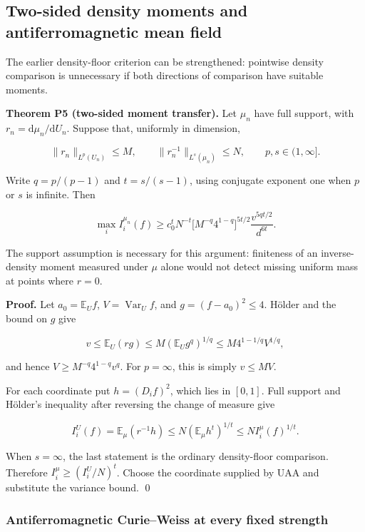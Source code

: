 \subsection{Two-sided density moments and antiferromagnetic mean
field}\label{proof:positive_structure:two-sided-density-moments-and-antiferromagnetic-mean-field}

The earlier density-floor criterion can be strengthened: pointwise
density comparison is unnecessary if both directions of comparison have
suitable moments.

\textbf{Theorem P5 (two-sided moment transfer).} Let \(\mu _n\) have
full support, with \(r_n=\mathrm d\mu_n/\mathrm dU_n\). Suppose that, uniformly in
dimension,

\[
\|r_n\|_{L^p(U_n)}\le M,
\qquad \|r_n^{-1}\|_{L^s(\mu_n)}\le N,
\qquad p,s\in(1,\infty].
\]

Write \(q=p/(p-1)\) and \(t=s/(s-1)\), using conjugate exponent one when
\(p\) or \(s\) is infinite. Then

\[
\boxed{\max_i I_i^{\mu_n}(f)
\ge c_0^tN^{-t}\big[M^{-q}4^{1-q}\big]^{5t/2}
\frac{v^{5qt/2}}{d^{6t}}.}
\tag{P5}
\]

The support assumption is necessary for this argument: finiteness of an
inverse-density moment measured under \(\mu\) alone would not detect
missing uniform mass at points where \(r=0\).

\textbf{Proof.} Let \(a_0=\mathbb{E}_Uf\), \(V=\operatorname{Var}_Uf\),
and \(g=(f-a_0)^2\le 4\). Hölder and the bound on \(g\) give

\[
v\le \mathbb{E}_U(rg)\le M(\mathbb{E}_Ug^q)^{1/q}
\le M4^{1-1/q}V^{1/q},
\]

and hence \(V\ge M^{-q}4^{1-q}v^q\). For \(p=\infty\), this is simply
\(v\le MV\).

For each coordinate put \(h=(D_i f)^2\), which lies in \([0,1]\). Full
support and Hölder's inequality after reversing the change of measure
give

\[
I_i^U(f)=\mathbb{E}_\mu(r^{-1}h)
\le N(\mathbb{E}_\mu h^t)^{1/t}
\le N I_i^\mu(f)^{1/t}.
\]

When \(s=\infty\), the last statement is the ordinary density-floor
comparison. Therefore \(I_i^\mu  \ge  (I_i^U/N)^t\). Choose the
coordinate supplied by UAA and substitute the variance bound.
\qed

\subsubsection{Antiferromagnetic Curie--Weiss at every fixed
strength}\label{proof:positive_structure:antiferromagnetic-curieweiss-at-every-fixed-strength}

